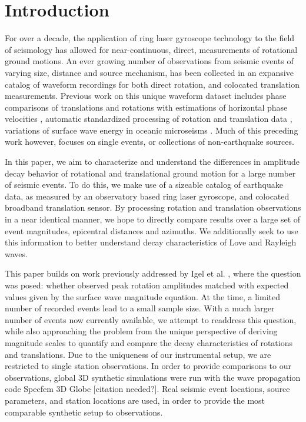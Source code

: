 \documentclass{gji}
\begin{document}
\section{Introduction} 
For over a decade, the application of ring laser gyroscope technology to the field of seismology has allowed for near-continuous, direct, measurements of rotational ground motions. An ever growing number of observations from seismic events of varying size, distance and source mechanism, has been collected in an expansive catalog of waveform recordings for both direct rotation, and colocated translation measurements.
Previous work on this unique waveform dataset includes phase comparisons of translations and rotations with estimations of horizontal phase velocities \cite{igel2005rotational},
automatic standardized processing of rotation and translation data \cite{salvermoser2017event},
variations of surface wave energy in oceanic microseisms \cite{tanimoto2016seasonal}.
Much of this preceding work however, focuses on single events, or collections of non-earthquake sources.

In this paper, we aim to characterize and understand the differences in amplitude decay behavior of rotational and translational ground motion for a large number of seismic events. To do this, we make use of a sizeable catalog of earthquake data, as measured by an observatory based ring laser gyroscope, and colocated broadband translation sensor. By processing rotation and translation observations in a near identical manner, we hope to directly compare results over a large set of event magnitudes, epicentral distances and  azimuths. We additionally seek to use this information to better understand decay characteristics of Love and Rayleigh waves.

This paper builds on work previously addressed by Igel et al. , 
where the question was posed: whether observed peak rotation amplitudes matched with expected values given by the surface wave magnitude equation. At the time, a limited number of recorded events lead to a small sample size. With a much larger number of events now currently available, we attempt to readdress this question, while also approaching the problem from the unique perspective of deriving magnitude scales to quantify and compare the decay characteristics of rotations and translations. Due to the uniqueness of our instrumental setup, we are restricted to single station observations. In order to provide comparisons to our observations, global 3D synthetic simulations were run with the wave propagation code Specfem 3D Globe [citation needed?]. Real seismic event locations, source parameters, and station locations are used, in order to provide the most comparable synthetic setup to observations. 
\end{document}
